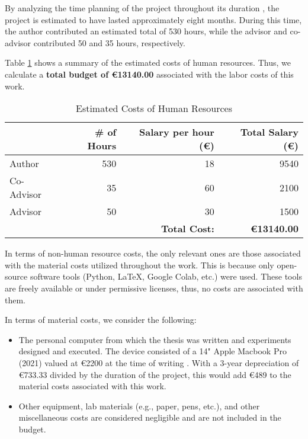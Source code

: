 \documentclass[../main.tex]{subfiles}
\begin{document}
By analyzing the time planning of the project throughout its duration , the project is estimated to have lasted approximately eight months. During this time, the author contributed an estimated total of 530 hours, while the advisor and co-advisor contributed 50 and 35 hours, respectively. 

Table \ref{tab:budget-human_resources} shows a summary of the estimated costs of human resources. Thus, we calculate a \textbf{total budget of €13140.00} associated with the labor costs of this work.

\begin{table}[H]
    \centering
    \caption{Estimated Costs of Human Resources}
    \label{tab:budget-human_resources}
    \begin{tabular}{lrrr}
    \toprule
    {} &  \# of Hours &  Salary per hour (€) &  Total Salary (€) \\
    \midrule
    Author  &                   530 &                   18 &         9540 \\
    Co-Advisor &                35 &                    60 &         2100 \\
    Advisor &                   50 &                    30 &         1500 \\
    \bottomrule
    {} &  {} & \textbf{Total Cost:} & \textbf{€13140.00} \\
    \end{tabular}
\end{table}

\vspace{-0.4cm}

In terms of non-human resource costs, the only relevant ones are those associated with the material costs utilized throughout the work. This is because only open-source software tools (Python, LaTeX, Google Colab, etc.) were used. These tools are freely available or under permissive licenses, thus, no costs are associated with them.

In terms of material costs, we consider the following:

\begin{itemize}
    \item The personal computer from which the thesis was written and experiments designed and executed. The device consisted of a 14" Apple Macbook Pro (2021) valued at €2200 at the time of writing \cite{apple_comprar_2022}. With a 3-year depreciation of €733.33 divided by the duration of the project, this would add €489 to the material costs associated with this work.
    \item Other equipment, lab materials (e.g., paper, pens, etc.), and other miscellaneous costs are considered negligible and are not included in the budget.
\end{itemize}
\end{document}

